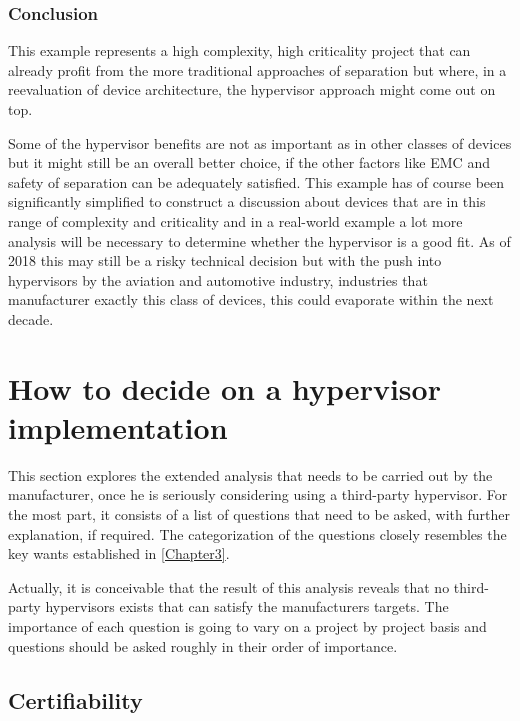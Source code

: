 \subsubsection{Conclusion}
This example represents a high complexity, high criticality project that can already profit from the more traditional approaches of separation but where, in a reevaluation of device architecture, the hypervisor approach might come out on top. 

Some of the hypervisor benefits are not as important as in other classes of devices but it might still be an overall better choice, if the other factors like \gls{EMC} and safety of separation can be adequately satisfied. This example has of course been significantly simplified to construct a discussion about devices that are in this range of complexity and criticality and in a real-world example a lot more analysis will be necessary to determine whether the hypervisor is a good fit. As of 2018 this may still be a risky technical decision but with the push into hypervisors by the aviation and automotive industry, industries that manufacturer exactly this class of devices, this could evaporate within the next decade.


\section{How to decide on a hypervisor implementation} \label{how-to-decide}
This section explores the extended analysis that needs to be carried out by the manufacturer, once he is seriously considering using a third-party hypervisor. For the most part, it consists of a list of questions that need to be asked, with further explanation, if required. The categorization of the questions closely resembles the key wants established in \ref{Chapter3}.

Actually, it is conceivable that the result of this analysis reveals that no third-party hypervisors exists that can satisfy the manufacturers targets. The importance of each question is going to vary on a project by project basis and questions should be asked roughly in their order of importance. 

\subsection{Certifiability}
